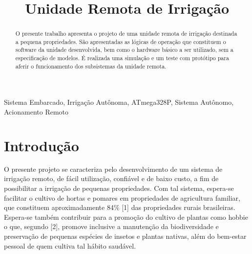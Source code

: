 \documentclass[conference]{IEEEtran}
\begin{document}
\title{Unidade Remota de Irrigação\\}

\author{
\and
{}
\and
{}
}

\maketitle

\begin{abstract}

O presente trabalho apresenta o projeto de uma unidade remota de irrigação destinada a pequena propriedades. São apresentadas as lógicas de operação que constituem o software da unidade desenvolvida, bem como o hardware básico a ser utilizado, sem a especificação de modelos. É realizada uma simulação e um teste com protótipo para aferir o funcionamento dos subsistemas da unidade remota.

\end{abstract}

\begin{IEEEkeywords}
Sistema Embarcado, Irrigação Autônoma, ATmega328P, Sistema Autônomo, Acionamento Remoto
\end{IEEEkeywords}

\section{Introdução}

O presente projeto se caracteriza pelo desenvolvimento de um sistema de irrigação remoto, de fácil utilização, confiável e de baixo custo, a fim de possibilitar a irrigação de pequenas propriedades. Com tal sistema, espera-se facilitar o cultivo de hortas e pomares em propriedades de agricultura familiar, que constituem aproximadamente 84\% [1] das propriedades rurais brasileiras. Espera-se também contribuir para a promoção do cultivo de plantas como hobbie o que, segundo [2], promove inclusive a manutenção da biodiversidade e preservação de pequenas espécies de insetos e plantas nativas, além do bem-estar pessoal de quem cultiva tal hábito saudável.
\end{document}

